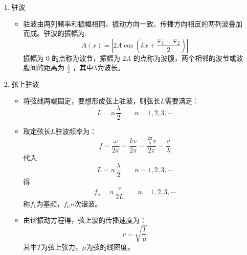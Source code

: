 \documentclass[11pt]{article}
\begin{document}
\begin{enumerate}
	\item 驻波
	\begin{itemize}
		\item 驻波由两列频率和振幅相同、振动方向一致、传播方向相反的两列波叠加而成。驻波的振幅为:
		\begin{equation*}
			A(x)=\left| 2A \cos(kx+\frac{\varphi_{1}-\varphi_{2}}{2}) \right|
		\end{equation*}
		振幅为
		\begin{math}
			0
		\end{math}
		的点称为波节，振幅为
		\begin{math}
			2A
		\end{math}
		的点称为波腹，两个相邻的波节或波腹间的距离为
		\begin{math}
			\frac{\lambda}{2}
		\end{math}
		，其中\(\lambda\)为波长。
	\end{itemize}
	\item 弦上驻波
	\begin{itemize}
		\item 将弦线两端固定，要想形成弦上驻波，则弦长\(L\)需要满足：
		\begin{equation*}
			L=n \, \frac{\lambda}{2} \qquad n=1,2,3,\dotsb
		\end{equation*}
		\item 取定弦长\(L\)驻波频率为：
		\begin{equation*}
			f=\frac{\omega}{2\pi}=\frac{kv}{2\pi}=\frac{\frac{2\pi}{\lambda}v}{2\pi}=\frac{v}{\lambda}
		\end{equation*}
		代入
		\begin{equation*}
			L=n \, \frac{\lambda}{2} \qquad n=1,2,3,\dotsb
		\end{equation*}
		得
		\begin{equation*}
			f_{n}=n \, \frac{v}{2L} \qquad n=1,2,3,\dotsb
		\end{equation*}
		称\(f_{1}\)为基频，\(f_{n}\)\(n\)次谐波。
	\end{itemize}
	\begin{itemize}
		\item 由谐振动方程得，弦上波的传播速度为：
		\begin{equation*}
			v=\sqrt{\frac{T}{\mu}}
		\end{equation*}
		其中\(T\)为弦上张力，\(\mu\)为弦的线密度。
	\end{itemize}
\end{enumerate}
\end{document}
